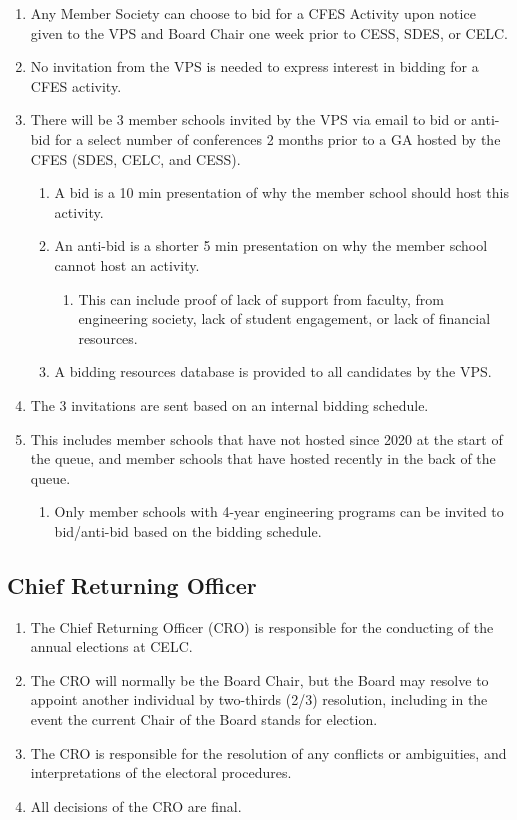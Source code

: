 \begin{enumerate}
 \item
  Any Member Society can choose to bid for a CFES Activity upon notice given to the VPS and Board Chair one week prior to CESS, SDES, or CELC.
 \item
  No invitation from the VPS is needed to express interest in bidding for a CFES activity.
 \item
  There will be 3 member schools invited by the VPS via email to bid or anti-bid for a select number of conferences 2 months prior to a GA hosted by the CFES (SDES, CELC, and CESS).

  \begin{enumerate}
   \item
    A bid is a 10 min presentation of why the member school should host this activity.
   \item
    An anti-bid is a shorter 5 min presentation on why the member school cannot host an activity.

    \begin{enumerate}
     \item
      This can include proof of lack of support from faculty, from engineering society, lack of student engagement, or lack of financial resources.
    \end{enumerate}
   \item
    A bidding resources database is provided to all candidates by the VPS.
  \end{enumerate}
 \item
  The 3 invitations are sent based on an internal bidding schedule.
 \item
  This includes member schools that have not hosted since 2020 at the start of the queue, and member schools that have hosted recently in the back of the queue.

  \begin{enumerate}
   \item
    Only member schools with 4-year engineering programs can be invited to bid/anti-bid based on the bidding schedule.
  \end{enumerate}
\end{enumerate}

\subsection{Chief Returning Officer}
\label{chief-returning-officer}

\begin{enumerate}
 \item
  The Chief Returning Officer (CRO) is responsible for the conducting of the annual elections at CELC.
 \item
  The CRO will normally be the Board Chair, but the Board may resolve to appoint another individual by two-thirds (2/3) resolution, including in the event the current Chair of the Board stands for election.
 \item
  The CRO is responsible for the resolution of any conflicts or ambiguities, and interpretations of the electoral procedures.
 \item
  All decisions of the CRO are final.
\end{enumerate}


